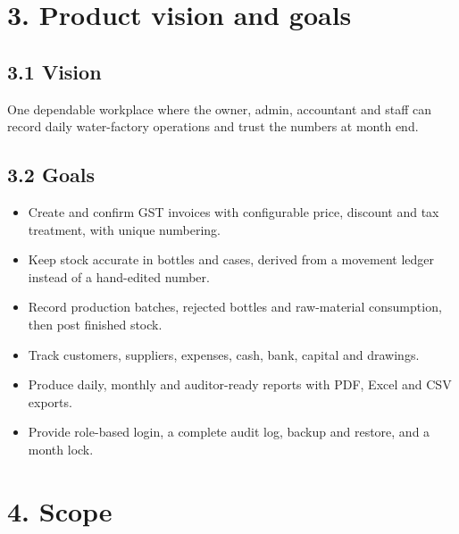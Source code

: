 \documentclass[11pt]{article}
\begin{document}
\section{3. Product vision and goals}
\subsection{3.1 Vision}
One dependable workplace where the owner, admin, accountant and staff can record daily water-factory operations and trust the numbers at month end.
\subsection{3.2 Goals}
\begin{itemize}[leftmargin=*,itemsep=2pt,topsep=2pt]
\item Create and confirm GST invoices with configurable price, discount and tax treatment, with unique numbering.
\item Keep stock accurate in bottles and cases, derived from a movement ledger instead of a hand-edited number.
\item Record production batches, rejected bottles and raw-material consumption, then post finished stock.
\item Track customers, suppliers, expenses, cash, bank, capital and drawings.
\item Produce daily, monthly and auditor-ready reports with PDF, Excel and CSV exports.
\item Provide role-based login, a complete audit log, backup and restore, and a month lock.
\end{itemize}
\clearpage
\section{4. Scope}
\end{document}
